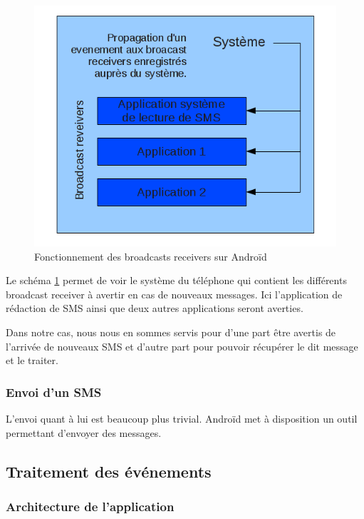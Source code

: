 \begin{figure}[!h]
  \center
  \includegraphics[width=12cm]{img/broadcast-receivers.png}
  \caption{Fonctionnement des broadcasts receivers sur Androïd}
  \label{broadcast-receivers}
\end{figure}

Le schéma \ref{broadcast-receivers} permet de voir le système du téléphone qui contient les différents broadcast receiver à avertir en cas de nouveaux messages. Ici l'application de rédaction de SMS ainsi que deux autres 
applications seront averties.

Dans notre cas, nous nous en sommes servis pour d'une part être avertis de l'arrivée de nouveaux SMS et d'autre part pour pouvoir récupérer le dit message et le traiter.


\subsubsection{Envoi d'un SMS}

L'envoi quant à lui est beaucoup plus trivial. Androïd met à disposition un outil permettant d'envoyer
des messages.



\subsection{Traitement des événements}

\subsubsection{Architecture de l'application}

